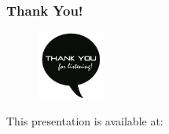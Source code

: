 \documentclass[hyperref={pdfpagelabels=true}]{beamer}
\begin{document}
\begin{frame}
\frametitle{Thank You!}
    \begin{figure}   
      \includegraphics[width=0.2\textwidth]{thanks.jpg}      
    \end{figure}   
    This presentation is available at: 
      \vspace{5mm}    
\end{frame}
\end{document}
